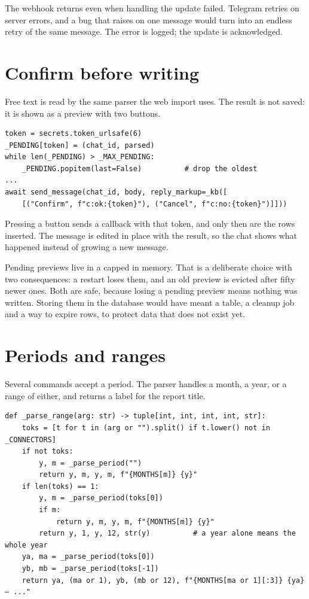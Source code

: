 \begin{pitfall}
The webhook returns  even when handling the update failed. Telegram
retries on server errors, and a bug that raises on one message would turn into
an endless retry of the same message. The error is logged; the update is
acknowledged.
\end{pitfall}

\section{Confirm before writing}

Free text is read by the same parser the web import uses. The result is not
saved: it is shown as a preview with two buttons.

\begin{lstlisting}[style=py]
token = secrets.token_urlsafe(6)
_PENDING[token] = (chat_id, parsed)
while len(_PENDING) > _MAX_PENDING:
    _PENDING.popitem(last=False)          # drop the oldest
...
await send_message(chat_id, body, reply_markup=_kb([
    [("Confirm", f"c:ok:{token}"), ("Cancel", f"c:no:{token}")]]))
\end{lstlisting}

Pressing a button sends a callback with that token, and only then are the rows
inserted. The message is edited in place with the result, so the chat shows what
happened instead of growing a new message.

Pending previews live in a capped  in memory. That is a
deliberate choice with two consequences: a restart loses them, and an old
preview is evicted after fifty newer ones. Both are safe, because losing a
pending preview means nothing was written. Storing them in the database would
have meant a table, a cleanup job and a way to expire rows, to protect data that
does not exist yet.

\section{Periods and ranges}

Several commands accept a period. The parser handles a month, a year, or a range
of either, and returns a label for the report title.

\begin{lstlisting}[style=py]
def _parse_range(arg: str) -> tuple[int, int, int, int, str]:
    toks = [t for t in (arg or "").split() if t.lower() not in _CONNECTORS]
    if not toks:
        y, m = _parse_period("")
        return y, m, y, m, f"{MONTHS[m]} {y}"
    if len(toks) == 1:
        y, m = _parse_period(toks[0])
        if m:
            return y, m, y, m, f"{MONTHS[m]} {y}"
        return y, 1, y, 12, str(y)          # a year alone means the whole year
    ya, ma = _parse_period(toks[0])
    yb, mb = _parse_period(toks[-1])
    return ya, (ma or 1), yb, (mb or 12), f"{MONTHS[ma or 1][:3]} {ya} – ..."
\end{lstlisting}

